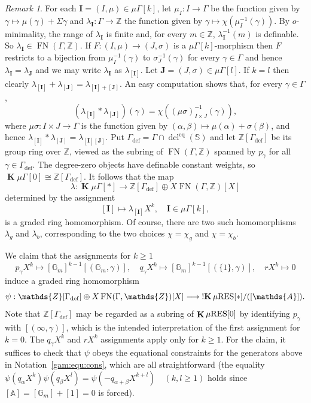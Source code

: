 \documentclass[12pt]{amsart}
\theoremstyle{plain}
\theoremstyle{definition}
\theoremstyle{remark}
\newtheorem{rem}[thm]{Remark}
\numberwithin{equation}{section}
\theoremstyle{plain}
\DeclareMathOperator{\dcl}{dcl}
\newcommand{\Z}{\mathds{Z}}
\newcommand{\A}{\mathds{A}}
\newcommand{\G}{\mathds{G}}
\newcommand{\omin}{$o$\nobreakdash}
\newcommand{\0}{\emptyset}
\newcommand{\fun}{\longrightarrow}
\newcommand{\efun}{\longmapsto}
\newcommand{\mG}{{\mu}{\Gamma}}
\newcommand{\RES}{\textup{RES}}
\newcommand{\mgRES}{{\mu}{\RES}}
\DeclareMathOperator{\ggk}{\mathbf{K}}
\DeclareMathOperator{\sggk}{!\mathbf{K}}
\DeclareMathOperator{\fn}{FN}
\begin{document}
\begin{rem}\label{int:Gam}
For each $\bm I = (I, \mu) \in \mG[k]$, let $\mu_I : I \fun \Gamma$ be the function given by $\gamma \efun \mu(\gamma) + \Sigma\gamma$ and $\lambda_{\bm I} : \Gamma \fun \Z$  the function given by $\gamma \efun \chi(\mu^{-1}_I(\gamma))$. By \omin-minimality, the range of $\lambda_{\bm I}$ is finite and, for every $m \in \Z$, $\lambda_{\bm I}^{-1}(m)$ is definable. So $\lambda_{\bm I} \in \fn(\Gamma, \Z)$. If $F :(I, \mu) \fun (J, \sigma)$ is a $\mG[k]$-morphism then $F$ restricts to a bijection from $\mu^{-1}_I(\gamma)$ to $\sigma_J^{-1}(\gamma)$ for every $\gamma \in \Gamma$ and hence $\lambda_{\bm I} = \lambda_{\bm J}$ and we may write $\lambda_{\bm I}$ as $\lambda_{[\bm I]}$. Let $\bm J = (J, \sigma) \in \mG[l]$. If $k=l$ then clearly $\lambda_{[\bm I]} + \lambda_{[\bm J]} = \lambda_{[\bm I]+[\bm J]}$. An easy computation shows that, for every $\gamma \in \Gamma$,
\[
(\lambda_{[\bm I]} * \lambda_{[\bm J]})(\gamma) = \chi( (\mu \sigma)^{-1}_{I \times J}(\gamma)),
\]
where $\mu \sigma : I \times J \fun \Gamma$ is the function given by $(\alpha, \beta) \efun \mu(\alpha) + \sigma(\beta)$, and hence $\lambda_{[\bm I]} * \lambda_{[\bm J]} = \lambda_{[\bm I][\bm J]}$. Put $\Gamma_{\mathrm{def}}=\Gamma\cap\dcl^{\mathrm{eq}}(\mathbb S)$ and let $\Z[\Gamma_{\mathrm{def}}]$ be its group ring over $\Z$, viewed as the subring of $\fn(\Gamma,\Z)$ spanned by $p_\gamma$ for all $\gamma\in\Gamma_{\mathrm{def}}$. The degree-zero objects have definable constant weights, so $\ggk\mG[0]\cong\Z[\Gamma_{\mathrm{def}}]$. It follows that the map
\[
\lambda : \ggk \mG[*] \fun \Z[\Gamma_{\mathrm{def}}] \oplus X \fn(\Gamma, \Z)[X]
\]
determined by the assignment
\[
[\bm I] \efun \lambda_{[\bm I]}X^k, \quad \bm I \in \mG[k],
\]
is a graded ring homomorphism. Of course, there are two such homomorphisms $\lambda_g$ and $\lambda_b$, corresponding to the two choices $\chi = \chi_{g}$ and $\chi = \chi_{b}$.
\end{rem}




We claim that the assignments for $k\geq1$
\begin{equation}\label{Gam:ass}
p_\gamma X^k \efun  [\G_m]^{k-1}[(\G_m, \gamma)], \quad q_\gamma X^k \efun  [\G_m]^{k-1}[(\{1\}, \gamma)], \quad r X^k \efun 0
\end{equation}
induce a graded ring homomorphism
\[
\psi : \Z[\Gamma_{\mathrm{def}}] \oplus X\fn(\Gamma, \Z)[X] \fun \sggk \mgRES[*] / ([\A]).
\]
Note that $\Z[\Gamma_{\mathrm{def}}]$ may be regarded as a subring of $\ggk \mgRES[0]$ by identifying $p_\gamma$ with $[(\infty, \gamma)]$, which is the intended interpretation of the first assignment for $k = 0$. The $q_\gamma X^k$ and $rX^k$ assignments apply only for $k\geq1$. For the claim, it suffices to check that $\psi$ obeys the equational constraints for the generators above in Notation~\ref{gam:equ:cons}, which are all straightforward (the equality $\psi(q_\alpha X^k)\psi(q_\beta X^l)=\psi(-q_{\alpha+\beta}X^{k+l})\quad(k,l\geq1)$ holds since $[\A] = [\G_m] +[1] = 0$ is forced).
\end{document}
